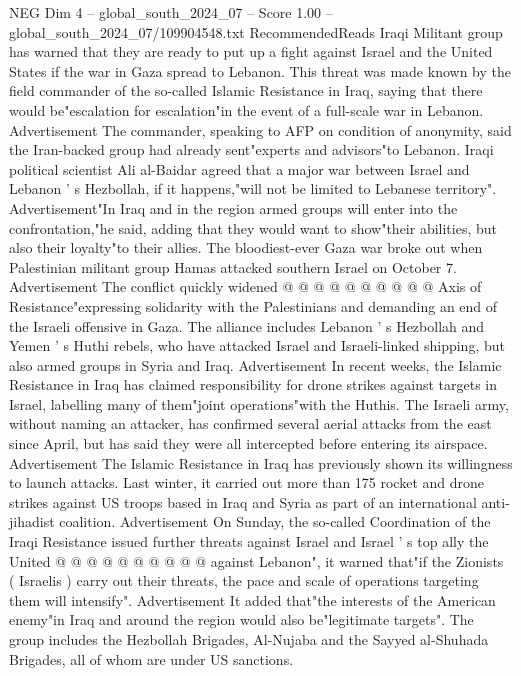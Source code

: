 \begin{textsample}{NEG Dim 4 – global\_south\_2024\_07 – Score 1.00 – global\_south\_2024\_07/109904548.txt}  \label{ex:f4_neg_347}
RecommendedReads Iraqi Militant group has warned that they are ready to put up a fight against Israel and the United States if the war in Gaza spread to Lebanon.
This threat was made known by the field commander of the so-called Islamic Resistance in Iraq, saying that there would be"escalation for escalation"in the event of a full-scale war in Lebanon.
Advertisement The commander, speaking to AFP on condition of anonymity, said the Iran-backed group had already sent"experts and advisors"to Lebanon.
Iraqi political scientist Ali al-Baidar agreed that a major war between Israel and Lebanon ' s Hezbollah, if it happens,"will not be limited to Lebanese territory".
Advertisement"In Iraq and in the region armed groups will enter into the confrontation,"he said, adding that they would want to show"their abilities, but also their loyalty"to their allies.
The bloodiest-ever Gaza war broke out when Palestinian militant group Hamas attacked southern Israel on October 7.
Advertisement The conflict quickly widened @ @ @ @ @ @ @ @ @ @ Axis of Resistance"expressing solidarity with the Palestinians and demanding an end of the Israeli offensive in Gaza.
The alliance includes Lebanon ' s Hezbollah and Yemen ' s Huthi rebels, who have attacked Israel and Israeli-linked shipping, but also armed groups in Syria and Iraq.
Advertisement In recent weeks, the Islamic Resistance in Iraq has claimed responsibility for drone strikes against targets in Israel, labelling many of them"joint operations"with the Huthis.
The Israeli army, without naming an attacker, has confirmed several aerial attacks from the east since April, but has said they were all intercepted before entering its airspace.
Advertisement The Islamic Resistance in Iraq has previously shown its willingness to launch attacks.
Last winter, it carried out more than 175 rocket and drone strikes against US troops based in Iraq and Syria as part of an international anti-jihadist coalition.
Advertisement On Sunday, the so-called Coordination of the Iraqi Resistance issued further threats against Israel and Israel ' s top ally the United @ @ @ @ @ @ @ @ @ @ against Lebanon", it warned that"if the Zionists ( Israelis ) carry out their threats, the pace and scale of operations targeting them will intensify".
Advertisement It added that"the interests of the American enemy"in Iraq and around the region would also be"legitimate targets".
The group includes the Hezbollah Brigades, Al-Nujaba and the Sayyed al-Shuhada Brigades, all of whom are under US sanctions.

\end{textsample}
